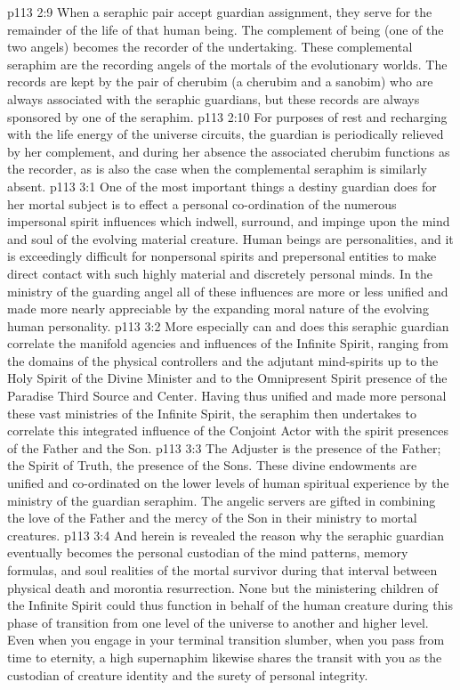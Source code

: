 \vs p113 2:9 When a seraphic pair accept guardian assignment, they serve for the remainder of the life of that human being. The complement of being (one of the two angels) becomes the recorder of the undertaking. These complemental seraphim are the recording angels of the mortals of the evolutionary worlds. The records are kept by the pair of cherubim (a cherubim and a sanobim) who are always associated with the seraphic guardians, but these records are always sponsored by one of the seraphim.
\vs p113 2:10 For purposes of rest and recharging with the life energy of the universe circuits, the guardian is periodically relieved by her complement, and during her absence the associated cherubim functions as the recorder, as is also the case when the complemental seraphim is similarly absent.
\vs p113 3:1 One of the most important things a destiny guardian does for her mortal subject is to effect a personal co\hyp{}ordination of the numerous impersonal spirit influences which indwell, surround, and impinge upon the mind and soul of the evolving material creature. Human beings are personalities, and it is exceedingly difficult for nonpersonal spirits and prepersonal entities to make direct contact with such highly material and discretely personal minds. In the ministry of the guarding angel all of these influences are more or less unified and made more nearly appreciable by the expanding moral nature of the evolving human personality.
\vs p113 3:2 More especially can and does this seraphic guardian correlate the manifold agencies and influences of the Infinite Spirit, ranging from the domains of the physical controllers and the adjutant mind\hyp{}spirits up to the Holy Spirit of the Divine Minister and to the Omnipresent Spirit presence of the Paradise Third Source and Center. Having thus unified and made more personal these vast ministries of the Infinite Spirit, the seraphim then undertakes to correlate this integrated influence of the Conjoint Actor with the spirit presences of the Father and the Son.
\vs p113 3:3 The Adjuster is the presence of the Father; the Spirit of Truth, the presence of the Sons. These divine endowments are unified and co\hyp{}ordinated on the lower levels of human spiritual experience by the ministry of the guardian seraphim. The angelic servers are gifted in combining the love of the Father and the mercy of the Son in their ministry to mortal creatures.
\vs p113 3:4 And herein is revealed the reason why the seraphic guardian eventually becomes the personal custodian of the mind patterns, memory formulas, and soul realities of the mortal survivor during that interval between physical death and morontia resurrection. None but the ministering children of the Infinite Spirit could thus function in behalf of the human creature during this phase of transition from one level of the universe to another and higher level. Even when you engage in your terminal transition slumber, when you pass from time to eternity, a high supernaphim likewise shares the transit with you as the custodian of creature identity and the surety of personal integrity.
